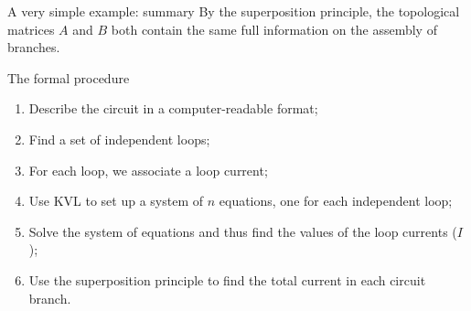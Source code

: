 \documentclass[xcolor=dvipsnames]{beamer}
\begin{document}
\begin{frame}{A very simple example: summary}
	By the superposition principle, the topological matrices $A$ and $B$ both contain the same full information on the assembly of branches.
\end{frame}

\begin{frame}{The formal procedure}
\begin{enumerate}
	\item Describe the circuit in a computer-readable format;
	\item Find a set of independent loops;
	\item For each loop, we associate a loop current;
	\item Use KVL to set up a system of $n$ equations, one for each independent loop;
	\item Solve the system of equations and thus find the values of the loop currents ($I$);
	\item Use the superposition principle to find the total current in each circuit branch.
\end{enumerate}
\end{frame}
\end{document}
